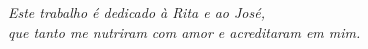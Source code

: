 \begin{dedicatoria}
   \vspace*{\fill}
   \centering
   \noindent
   \textit{Este trabalho é dedicado à Rita e ao José,\\
que tanto me nutriram com amor e acreditaram em mim.} \vspace*{\fill}
\end{dedicatoria}
